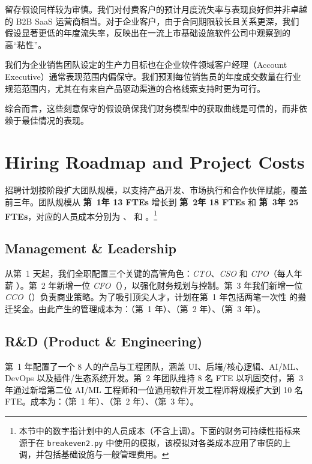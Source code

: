 \documentclass[11pt, a4paper, oneside]{article}
\begin{document}
留存假设同样较为审慎。我们对付费客户的预计月度流失率与表现良好但并非卓越的 B2B SaaS 运营商相当。对于企业客户，由于合同期限较长且关系更深，我们假设显著更低的年度流失率，反映出在一流上市基础设施软件公司中观察到的高“粘性”。

我们为企业销售团队设定的生产力目标也在企业软件领域客户经理（Account Executive）通常表现范围内偏保守。我们预测每位销售员的年度成交数量在行业规范范围内，尤其在有来自产品驱动渠道的合格线索支持时更为可行。

综合而言，这些刻意保守的假设确保我们财务模型中的获取曲线是可信的，而非依赖于最佳情况的表现。

\newpage
\section{Hiring Roadmap and Project Costs}
\label{sec:hiring-roadmap}

招聘计划按阶段扩大团队规模，以支持产品开发、市场执行和合作伙伴赋能，覆盖前三年。团队规模从 \textbf{第~1年 13 FTEs} 增长到 \textbf{第~2年 18 FTEs} 和 \textbf{第~3年 25 FTEs}，对应的人员成本分别为 \textbf{}、\textbf{} 和 \textbf{}。\footnote{本节中的数字指计划中的人员成本（不含上调）。下面的财务可持续性指标来源于在 \texttt{breakeven2.py} 中使用的模拟，该模拟对各类成本应用了审慎的上调，并包括基础设施与一般管理费用。}

\subsection{Management \& Leadership}
从第~1 天起，我们全职配置三个关键的高管角色：\textit{CTO}、\textit{CSO} 和 \textit{CPO}（每人年薪 ）。第~2 年新增一位 \textit{CFO}（），以强化财务规划与控制。第~3 年我们新增一位 \textit{CCO}（）负责商业策略。为了吸引顶尖人才，计划在第~1 年包括两笔一次性  的搬迁奖金。由此产生的管理成本为：\textbf{}（第~1 年）、\textbf{}（第~2 年）、\textbf{}（第~3 年）。

\subsection{R\&D (Product \& Engineering)}
第~1 年配置了一个 8 人的产品与工程团队，涵盖 UI、后端/核心逻辑、AI/ML、DevOps 以及插件/生态系统开发。第~2 年团队维持 8 名 FTE 以巩固交付，第~3 年通过新增第二位 AI/ML 工程师和一位通用软件开发工程师将规模扩大到 10 名 FTE。成本为：\textbf{}（第~1 年）、\textbf{}（第~2 年）、\textbf{}（第~3 年）。
\end{document}
